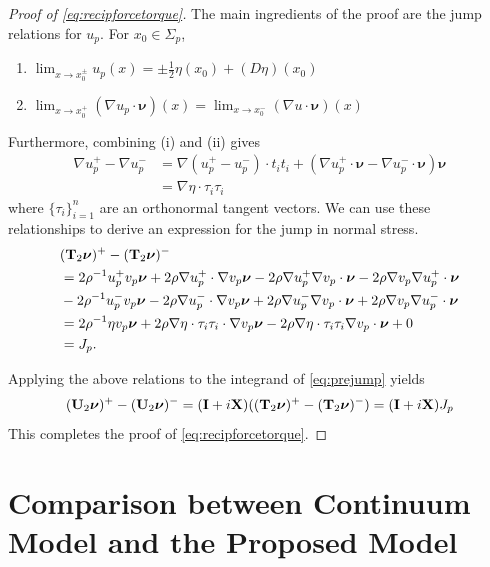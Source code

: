 \documentclass[lineno]{jfm}
\newcommand{\nnu}{\boldsymbol{\nu}}
\begin{document}
\begin{proof}[Proof of \eqref{eq:recipforcetorque}]
  The main ingredients of the proof are the jump relations
  for $u_p$. For $x_0 \in \Sigma_p$,
  \begin{enumerate}
  \item $ \lim_{x \to x_0^\pm } u_p(x) = \pm\frac{1}{2}\eta(x_0) + (D\eta)(x_0)$
  \item $ \lim_{x \to x_0^+ } (\nabla u_p \cdot \nnu) (x) = \lim_{x \to
    x_0^-} (\nabla u \cdot \nnu)(x)$
  \end{enumerate}
  Furthermore,
  combining (i) and (ii) gives
  \begin{align*}
    \nabla u_p^+ - \nabla u_p^-
    &= \nabla (u_p^+ - u_p^-) \cdot t_i t_i +  (\nabla  u_p^+\cdot
    \nnu  - \nabla u_p^- \cdot \nnu) \nnu\\
    &= \nabla \eta \cdot \tau_i \tau_i
  \end{align*}
  where $\{\tau_i\}_{i=1}^n$ are an orthonormal tangent vectors.
  We can use these relationships to derive an expression for the jump in
  normal stress.
  \begin{align*}
    &({\bf T}_2\nnu)^+ - ({\bf T}_2\nnu)^-
    \\
    &= 2\rho^{-1} u_p^+v_p \nnu + 2\rho \nabla u_p^+ \cdot \nabla v_p
    \nnu
    - 2 \rho \nabla u_p^+  \nabla v_p \cdot \nnu
    - 2 \rho \nabla v_p  \nabla u_p^+ \cdot \nnu\\
    &-2\rho^{-1} u_p^-v_p \nnu - 2\rho \nabla u_p^- \cdot \nabla v_p \nnu
    + 2 \rho \nabla u_p^-  \nabla v_p \cdot \nnu
    + 2 \rho \nabla v_p  \nabla u_p^- \cdot \nnu\\
    &= 2\rho^{-1} \eta v_p \nnu + 2\rho \nabla \eta \cdot \tau_i \tau_i
    \cdot \nabla v_p \nnu
    - 2\rho \nabla \eta \cdot \tau_i \tau_i \nabla v_p \cdot \nnu + 0\\
    &= J_p.
  \end{align*}

  Applying the above relations to the integrand of \eqref{eq:prejump} yields
  \[
  ({\bf U}_2\nnu)^+ - ({\bf U}_2\nnu)^-
  =
  ({\bf I} + i {\bf X})(({\bf T}_2\nnu)^+ - ({\bf T}_2\nnu)^-)
  = ({\bf I} + i {\bf X})J_p
  \]
  This completes the proof of \eqref{eq:recipforcetorque}.
\end{proof}




\section{\label{A2} Comparison between Continuum Model and the Proposed Model}
\end{document}
